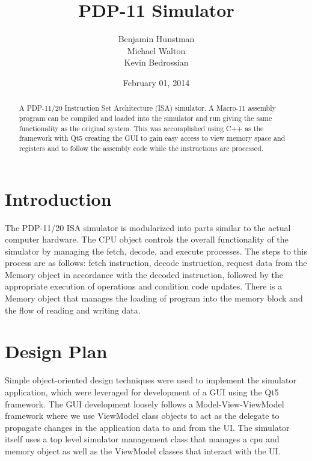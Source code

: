 \documentclass[]{report}   %
\begin{document}
\raggedright{}  %

\title{PDP-11 Simulator}   %
\author{Benjamin Hunstman \\
Michael Walton\\
Kevin Bedrossian}         %
\date{February 01, 2014}    %
\maketitle

\begin{abstract}
  A PDP-11/20 Instruction Set Architecture (ISA) simulator.  A Macro-11 assembly program can be compiled and loaded into the simulator and run giving the same functionality as the original system.  This was accomplished using C++ as the framework with Qt5 creating the GUI to gain easy access to view memory space and registers and to follow the assembly code while the instructions are processed.
\end{abstract}

\tableofcontents

\chapter{Introduction}
 The PDP-11/20 ISA simulator is modularized into parts similar to the actual computer hardware.  The CPU object controls the overall functionality of the simulator by managing the fetch, decode, and execute processes.  The steps to this process are as follows: fetch instruction, decode instruction, request data from the Memory object in accordance with the decoded instruction, followed by the appropriate execution of operations and condition code updates.  There is a Memory object that manages the loading of program into the memory block and the flow of reading and writing data. 

\chapter{Design Plan}
Simple object-oriented design techniques were used to implement the simulator application, which were leveraged for development of a GUI using the Qt5 framework\@. The GUI development loosely follows a Model-View-ViewModel framework where we use ViewModel class objects to act as the delegate to propagate changes in the application data to and from the UI\@. The simulator itself uses a top level simulator management class that manages a cpu and memory object as well as the ViewModel classes that interact with the UI\@.
\end{document}
